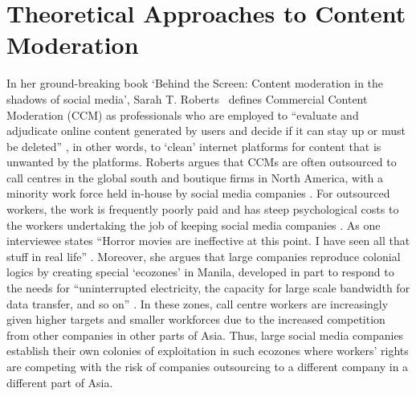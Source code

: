
\section{Theoretical Approaches to Content Moderation}
In her ground-breaking book `Behind the Screen: Content moderation in the shadows of social media', Sarah T. Roberts~\citeyearpar{Roberts:2019} defines Commercial Content Moderation (CCM) as professionals who are employed to ``evaluate and adjudicate online content generated by users and decide if it can stay up or must be deleted'' \citep[p. 1]{Roberts:2019}, in other words, to `clean' internet platforms for content that is unwanted by the platforms.
Roberts argues that CCMs are often outsourced to call centres in the global south and boutique firms in North America, with a minority work force held in-house by social media companies \citep{Roberts:2019}.
For outsourced workers, the work is frequently poorly paid and has steep psychological costs to the workers undertaking the job of keeping social media companies .
As one interviewee states ``Horror movies are ineffective at this point.
I have seen all that stuff in real life'' \citep[p. 122]{Roberts:2019}.
Moreover, she argues that large companies reproduce colonial logics by creating special `ecozones' in Manila, developed in part to respond to the needs for ``uninterrupted electricity, the capacity for large scale bandwidth for data transfer, and so on'' \citep[p. 183]{Roberts:2019}.
In these zones, call centre workers are increasingly given higher targets and smaller workforces \citep[p. 178]{Roberts:2019} due to the increased competition from other companies in other parts of Asia.
Thus, large social media companies establish their own colonies of exploitation in such ecozones where workers' rights are competing with the risk of companies outsourcing to a different company in a different part of Asia.


